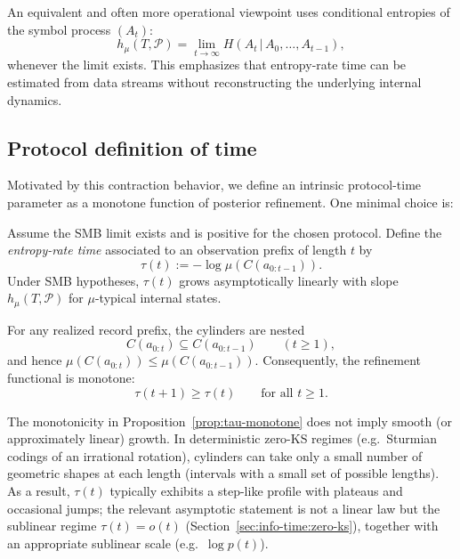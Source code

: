 An equivalent and often more operational viewpoint uses conditional entropies of the symbol process $(A_t)$:
\[
h_\mu(T,\mathcal{P})=\lim_{t\to\infty} H(A_t\,|\,A_0,\dots,A_{t-1}),
\]
whenever the limit exists. This emphasizes that entropy-rate time can be estimated from data streams without reconstructing the underlying internal dynamics.

\subsection{Protocol definition of time}\label{sec:info-time:definition}

Motivated by this contraction behavior, we define an intrinsic protocol-time parameter as a monotone function of posterior refinement. One minimal choice is:

\begin{definition}\label{def:entropy-time}
Assume the SMB limit exists and is positive for the chosen protocol. Define the \emph{entropy-rate time} associated to an observation prefix of length $t$ by
\[
\tau(t) := -\log \mu(C(a_{0:t-1})).
\]
Under SMB hypotheses, $\tau(t)$ grows asymptotically linearly with slope $h_\mu(T,\mathcal{P})$ for $\mu$-typical internal states.
\end{definition}

\begin{proposition}\label{prop:tau-monotone}
For any realized record prefix, the cylinders are nested
\[
C(a_{0:t})\subseteq C(a_{0:t-1}) \qquad (t\ge 1),
\]
and hence $\mu(C(a_{0:t}))\le \mu(C(a_{0:t-1}))$. Consequently, the refinement functional is monotone:
\[
\tau(t+1)\ge \tau(t)\qquad\text{for all }t\ge 1.
\]
\end{proposition}

\begin{remark}\label{rem:tau-step-like}
The monotonicity in Proposition~\ref{prop:tau-monotone} does not imply smooth (or approximately linear) growth. In deterministic zero-KS regimes (e.g.\ Sturmian codings of an irrational rotation), cylinders can take only a small number of geometric shapes at each length (intervals with a small set of possible lengths). As a result, $\tau(t)$ typically exhibits a step-like profile with plateaus and occasional jumps; the relevant asymptotic statement is not a linear law but the sublinear regime $\tau(t)=o(t)$ (Section~\ref{sec:info-time:zero-ks}), together with an appropriate sublinear scale (e.g.\ $\log p(t)$).
\end{remark}

